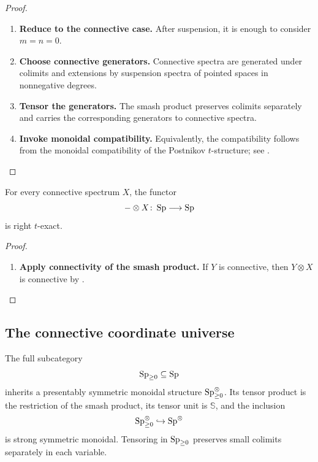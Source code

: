 \begin{proof}
\leavevmode
\begin{enumerate}[label=\textup{(\arabic*)}]
    \item \textbf{Reduce to the connective case.}
    After suspension, it is enough to consider $m=n=0$.

    \item \textbf{Choose connective generators.}
    Connective spectra are
    generated under colimits and extensions by suspension spectra of pointed
    spaces in nonnegative degrees.

    \item \textbf{Tensor the generators.}
    The smash product preserves colimits
    separately and carries the corresponding generators to connective
    spectra.

    \item \textbf{Invoke monoidal compatibility.}
    Equivalently, the compatibility follows from the monoidal
    compatibility of the Postnikov $t$-structure; see
    \cite{LurieHigherAlgebra}.
\end{enumerate}
\end{proof}

\begin{corollary}
\label{cor:connective-tensor-right-t-exact}
For every connective spectrum $X$, the functor
\[
    -\otimes X
    \colon
    \operatorname{Sp}
    \longrightarrow
    \operatorname{Sp}
\]
is right $t$-exact.
\end{corollary}

\begin{proof}
\leavevmode
\begin{enumerate}[label=\textup{(\arabic*)}]
    \item \textbf{Apply connectivity of the smash product.}
    If $Y$ is connective, then $Y\otimes X$ is connective by
    .
\end{enumerate}
\end{proof}

\subsection{The connective coordinate universe}

\begin{proposition}
\label{prop:connective-spectral-semantic-universe}
The full subcategory
\[
    \operatorname{Sp}_{\geq0}
    \subseteq
    \operatorname{Sp}
\]
inherits a presentably symmetric monoidal structure
\(\operatorname{Sp}_{\geq0}^\otimes\). Its tensor product is the restriction of the
smash product, its tensor unit is \(\mathbb S\), and the inclusion
\[
    \operatorname{Sp}_{\geq0}^\otimes
    \hookrightarrow
    \operatorname{Sp}^\otimes
\]
is strong symmetric monoidal. Tensoring in \(\operatorname{Sp}_{\geq0}\) preserves small
colimits separately in each variable.
\end{proposition}

